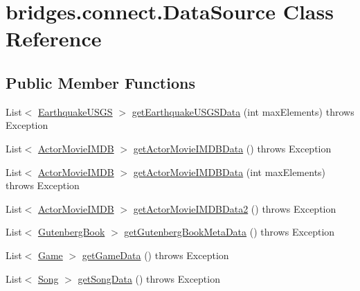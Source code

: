 \hypertarget{classbridges_1_1connect_1_1_data_source}{}\section{bridges.\+connect.\+Data\+Source Class Reference}
\label{classbridges_1_1connect_1_1_data_source}
\subsection*{Public Member Functions}
\begin{DoxyCompactItemize}
\item 
List$<$ \mbox{\hyperlink{classbridges_1_1data__src__dependent_1_1_earthquake_u_s_g_s}{Earthquake\+U\+S\+GS}} $>$ \mbox{\hyperlink{classbridges_1_1connect_1_1_data_source_a96f3bb21fc1557dd2c6466dce6a30e7f}{get\+Earthquake\+U\+S\+G\+S\+Data}} (int max\+Elements)  throws Exception 
\item 
List$<$ \mbox{\hyperlink{classbridges_1_1data__src__dependent_1_1_actor_movie_i_m_d_b}{Actor\+Movie\+I\+M\+DB}} $>$ \mbox{\hyperlink{classbridges_1_1connect_1_1_data_source_aaaef8df40e95d5370a7f172c301d2d9f}{get\+Actor\+Movie\+I\+M\+D\+B\+Data}} ()  throws Exception 
\item 
List$<$ \mbox{\hyperlink{classbridges_1_1data__src__dependent_1_1_actor_movie_i_m_d_b}{Actor\+Movie\+I\+M\+DB}} $>$ \mbox{\hyperlink{classbridges_1_1connect_1_1_data_source_a3b3c231fee0ce328fb8f79807742aecd}{get\+Actor\+Movie\+I\+M\+D\+B\+Data}} (int max\+Elements)  throws Exception 
\item 
List$<$ \mbox{\hyperlink{classbridges_1_1data__src__dependent_1_1_actor_movie_i_m_d_b}{Actor\+Movie\+I\+M\+DB}} $>$ \mbox{\hyperlink{classbridges_1_1connect_1_1_data_source_ae44e4ed7879e2755f8c66a335d8b6ad5}{get\+Actor\+Movie\+I\+M\+D\+B\+Data2}} ()  throws Exception 
\item 
List$<$ \mbox{\hyperlink{classbridges_1_1data__src__dependent_1_1_gutenberg_book}{Gutenberg\+Book}} $>$ \mbox{\hyperlink{classbridges_1_1connect_1_1_data_source_aff3adc9d08624062469315f2fe059044}{get\+Gutenberg\+Book\+Meta\+Data}} ()  throws Exception 
\item 
List$<$ \mbox{\hyperlink{classbridges_1_1data__src__dependent_1_1_game}{Game}} $>$ \mbox{\hyperlink{classbridges_1_1connect_1_1_data_source_ab3744c6b103281724bdd832da0924312}{get\+Game\+Data}} ()  throws Exception 
\item 
List$<$ \mbox{\hyperlink{classbridges_1_1data__src__dependent_1_1_song}{Song}} $>$ \mbox{\hyperlink{classbridges_1_1connect_1_1_data_source_ad4e2f30df95e8ce5976d0447c480522e}{get\+Song\+Data}} ()  throws Exception 

\end{DoxyCompactItemize}
